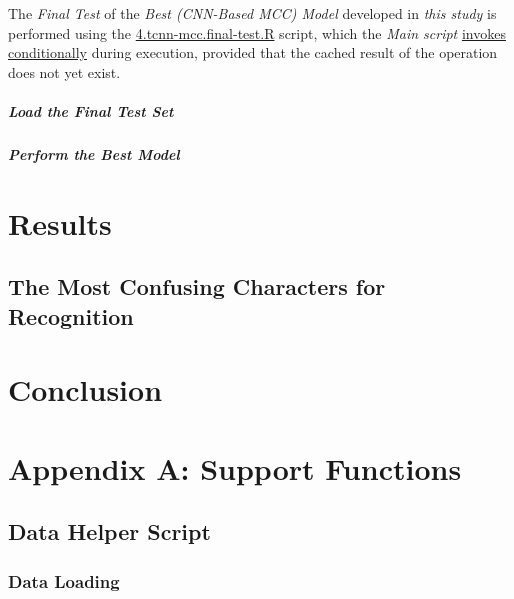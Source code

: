 \documentclass[
]{report}
\begin{document}
The \emph{Final Test} of the \emph{Best (CNN-Based MCC) Model} developed in \emph{this study} is performed using the \href{https://github.com/AzKurban-edX-DS/edx.capstone.choose-your-own/blob/main/r/models/cnn/mcc/tuner/4.tcnn-mcc.final-test.R}{4.tcnn-mcc.final-test.R} script, which the \emph{Main script} \href{https://github.com/AzKurban-edX-DS/edx.capstone.choose-your-own/blob/main/r/index.R\#L970}{invokes conditionally} during execution, provided that the cached result of the operation does not yet exist.

\paragraph{\texorpdfstring{Load the \emph{Final Test Set}}{Load the Final Test Set}}\label{tcnn.final_test_set}

\hfill\break

\paragraph{\texorpdfstring{Perform the \emph{Best Model}}{Perform the Best Model}}\label{tcnn.do.final_test}

\chapter{Results}\label{results}

\section{The Most Confusing Characters for Recognition}\label{the-most-confusing-characters-for-recognition}

\chapter{Conclusion}\label{conclusion}

\chapter{Appendix A: Support Functions}\label{appndx_a}

\section{Data Helper Script}\label{appndx_a.data_helper}

\hfill\break

\subsection{Data Loading}\label{appndx_a.data_helper.loading}
\end{document}
